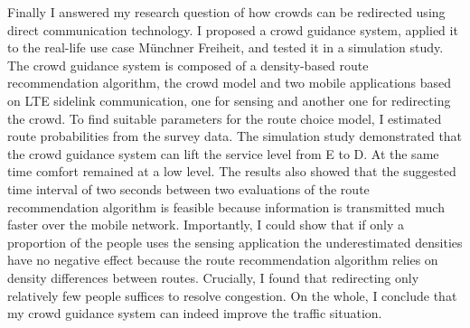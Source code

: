 %
Finally I answered my research question of how crowds can be redirected using direct communication technology. I proposed a crowd guidance system, applied it to the real-life use case Münchner Freiheit, and tested it in a simulation study.
The crowd guidance system is composed of a density-based route recommendation algorithm, the crowd model and two mobile applications based on LTE sidelink communication, one for sensing and another one for redirecting the crowd. To find suitable parameters for the route choice model, I estimated route probabilities from the survey data.  
The simulation study demonstrated that the crowd guidance system can lift the service level from E to D. At the same time comfort remained at a low level. 
The results also showed that the suggested time interval of two seconds between two evaluations of the route recommendation algorithm is feasible because information is transmitted much faster over the mobile network. 
Importantly, I could show that if only a proportion of the people uses the sensing application the underestimated densities have no negative effect because the route recommendation algorithm relies on density differences between routes. Crucially, I found that redirecting only relatively few people suffices to resolve congestion.
On the whole, I conclude that my crowd guidance system can indeed improve the traffic situation.
